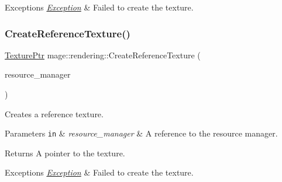 \begin{DoxyExceptions}{Exceptions}
{\em \mbox{\hyperlink{classmage_1_1_exception}{Exception}}} & Failed to create the texture. \\
\hline
\end{DoxyExceptions}
\mbox{\label{namespacemage_1_1rendering_a0f660325d9c268b8e57f680a1d0e24ac}} 
\subsubsection{\texorpdfstring{Create\+Reference\+Texture()}{CreateReferenceTexture()}}
{\footnotesize\ttfamily \mbox{\hyperlink{namespacemage_1_1rendering_a6f3ae54f825328465b0cdde0f0de4a36}{Texture\+Ptr}} mage\+::rendering\+::\+Create\+Reference\+Texture (\begin{DoxyParamCaption}\item[{\mbox{\hyperlink{classmage_1_1rendering_1_1_resource_manager}{Resource\+Manager}} \&}]{resource\+\_\+manager }\end{DoxyParamCaption})}

Creates a reference texture.


\begin{DoxyParams}[1]{Parameters}
\mbox{\tt in}  & {\em resource\+\_\+manager} & A reference to the resource manager. \\
\hline
\end{DoxyParams}
\begin{DoxyReturn}{Returns}
A pointer to the texture. 
\end{DoxyReturn}

\begin{DoxyExceptions}{Exceptions}
{\em \mbox{\hyperlink{classmage_1_1_exception}{Exception}}} & Failed to create the texture. \\
\hline
\end{DoxyExceptions}
\mbox{\label{namespacemage_1_1rendering_a7a0e0bcbedbc964d2ce28e1860b24158}} 
